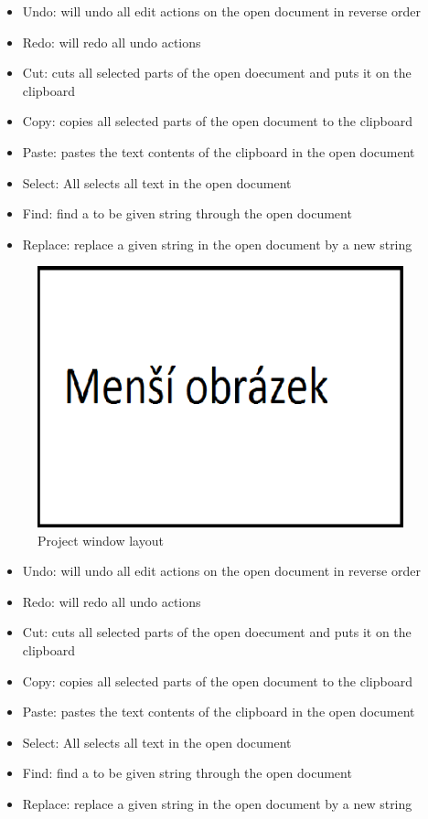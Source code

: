     \begin{itemize}
        \item Undo: will undo all edit actions on the open document in reverse order
        \item Redo: will redo all undo actions
        \item Cut: cuts all selected parts of the open doecument and puts it on the clipboard
        \item Copy: copies all selected parts of the open document to the clipboard
        \item Paste: pastes the text contents of the clipboard in the open document
        \item Select: All selects all text in the open document
        \item Find: find a to be given string through the open document
        \item Replace: replace a given string in the open document by a new string
    \end{itemize}

        \begin{figure}
            \centering{}
            \includegraphics [width=300pt]{img/mensi_obrazek.png}
            \caption{Project window layout}
        \end{figure}

    \begin{itemize}
        \item Undo: will undo all edit actions on the open document in reverse order
        \item Redo: will redo all undo actions
        \item Cut: cuts all selected parts of the open doecument and puts it on the clipboard
        \item Copy: copies all selected parts of the open document to the clipboard
        \item Paste: pastes the text contents of the clipboard in the open document
        \item Select: All selects all text in the open document
        \item Find: find a to be given string through the open document
        \item Replace: replace a given string in the open document by a new string
    \end{itemize}

